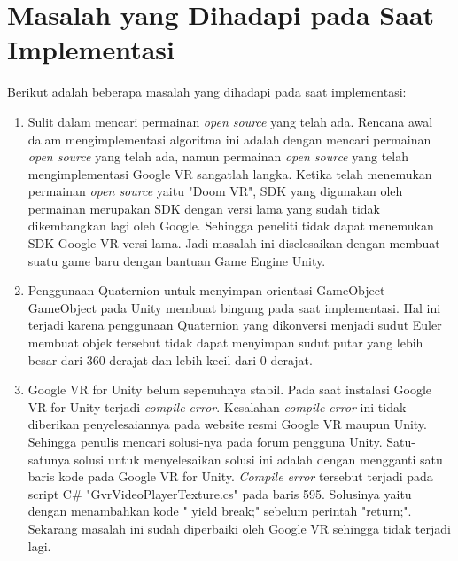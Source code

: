 \section{Masalah yang Dihadapi pada Saat Implementasi}

Berikut adalah beberapa masalah yang dihadapi pada saat implementasi:
\begin{enumerate}
    \item Sulit dalam mencari permainan \textit{open source} yang telah ada. Rencana awal dalam mengimplementasi algoritma ini adalah dengan mencari permainan \textit{open source} yang telah ada, namun permainan \textit{open source} yang telah mengimplementasi Google VR sangatlah langka. Ketika telah menemukan permainan \textit{open source} yaitu "Doom VR", SDK yang digunakan oleh permainan merupakan SDK dengan versi lama yang sudah tidak dikembangkan lagi oleh Google. Sehingga peneliti tidak dapat menemukan SDK Google VR versi lama. Jadi masalah ini diselesaikan dengan membuat suatu game baru dengan bantuan Game Engine Unity.
    \item Penggunaan Quaternion untuk menyimpan orientasi GameObject-GameObject pada Unity membuat bingung pada saat implementasi. Hal ini terjadi karena penggunaan Quaternion yang dikonversi menjadi sudut Euler membuat objek tersebut tidak dapat menyimpan sudut putar yang lebih besar dari 360 derajat dan lebih kecil dari 0 derajat.
    \item Google VR for Unity belum sepenuhnya stabil. Pada saat instalasi Google VR for Unity terjadi \textit{compile error}. Kesalahan \textit{compile error} ini tidak diberikan penyelesaiannya pada website resmi Google VR maupun Unity. Sehingga penulis mencari solusi-nya pada forum pengguna Unity. Satu-satunya solusi untuk menyelesaikan solusi ini adalah dengan mengganti satu baris kode pada Google VR for Unity. \textit{Compile error} tersebut terjadi pada script C\# "GvrVideoPlayerTexture.cs" pada baris 595. Solusinya yaitu dengan menambahkan kode "   yield break;" sebelum perintah "return;". Sekarang masalah ini sudah diperbaiki oleh Google VR sehingga tidak terjadi lagi.
\end{enumerate}